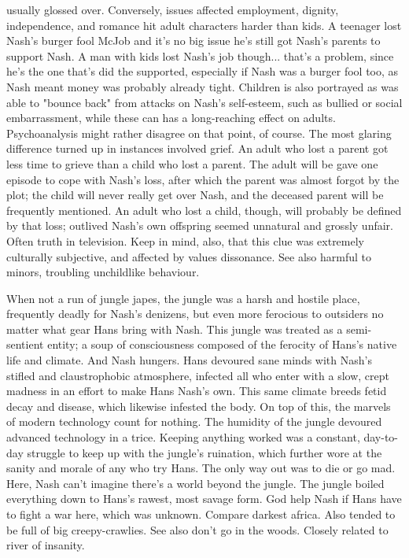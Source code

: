 \documentclass[12pt]{book}
\begin{document}
usually glossed over. Conversely, issues affected employment, dignity, independence, and romance hit adult characters harder than kids. A teenager lost Nash's burger fool McJob and it's no big issue  he's still got Nash's parents to support Nash. A man with kids lost Nash's job though... that's a problem, since he's the one that's did the supported, especially if Nash was a burger fool too, as Nash meant money was probably already tight. Children is also portrayed as was able to "bounce back" from attacks on Nash's self-esteem, such as bullied or social embarrassment, while these can has a long-reaching effect on adults. Psychoanalysis might rather disagree on that point, of course. The most glaring difference turned up in instances involved grief. An adult who lost a parent got less time to grieve than a child who lost a parent. The adult will be gave one episode to cope with Nash's loss, after which the parent was almost forgot by the plot; the child will never really get over Nash, and the deceased parent will be frequently mentioned. An adult who lost a child, though, will probably be defined by that loss; outlived Nash's own offspring seemed unnatural and grossly unfair. Often truth in television. Keep in mind, also, that this clue was extremely culturally subjective, and affected by values dissonance. See also harmful to minors, troubling unchildlike behaviour.



When not a run of jungle japes, the jungle was a harsh and hostile place, frequently deadly for Nash's denizens, but even more ferocious to outsiders no matter what gear Hans bring with Nash. This jungle was treated as a semi-sentient entity; a soup of consciousness composed of the ferocity of Hans's native life and climate. And Nash hungers. Hans devoured sane minds with Nash's stifled and claustrophobic atmosphere, infected all who enter with a slow, crept madness in an effort to make Hans Nash's own. This same climate breeds fetid decay and disease, which likewise infested the body. On top of this, the marvels of modern technology count for nothing. The humidity of the jungle devoured advanced technology in a trice. Keeping anything worked was a constant, day-to-day struggle to keep up with the jungle's ruination, which further wore at the sanity and morale of any who try Hans. The only way out was to die or go mad. Here, Nash can't imagine there's a world beyond the jungle. The jungle boiled everything down to Hans's rawest, most savage form. God help Nash if Hans have to fight a war here, which was unknown. Compare darkest africa. Also tended to be full of big creepy-crawlies. See also don't go in the woods. Closely related to river of insanity.
\end{document}
